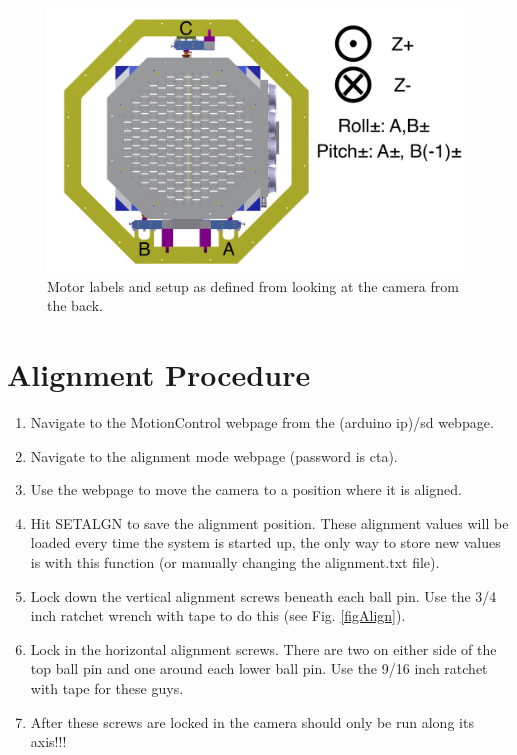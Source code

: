 \documentclass[11pt]{article}
\begin{document}
\begin{figure}[h]
\begin{center}
\includegraphics[width = 4.5in]{camerapic.png}
\caption{Motor labels and setup as defined from looking at the camera from the back.}  
\label{fd2}
\end{center}
\end{figure}


\section{Alignment Procedure}
\label{alignSec}
\begin{enumerate}
	\item Navigate to the MotionControl webpage from the (arduino ip)/sd webpage.
	\item Navigate to the alignment mode webpage (password is cta).
	\item Use the webpage to move the camera to a position where it is aligned.
	\item Hit SETALGN to save the alignment position.  These alignment values will be loaded every time the system is started up, the only way to store new values is with this function (or manually changing the alignment.txt file).
	\item Lock down the vertical alignment screws beneath each ball pin.  Use the 3/4 inch ratchet wrench with tape to do this (see Fig. \ref{figAlign}).
	\item Lock in the horizontal alignment screws.  There are two on either side of the top ball pin and one around each lower ball pin.
		Use the 9/16 inch ratchet with tape for these guys.
	\item After these screws are locked in the camera should only be run along its axis!!!
\end{enumerate}
\end{document}

